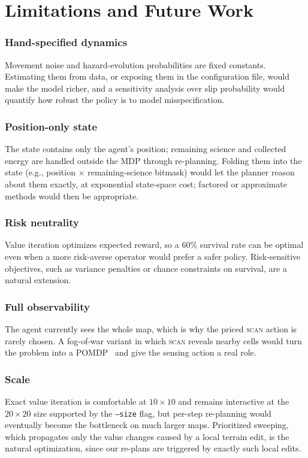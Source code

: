 \documentclass[conference]{IEEEtran}
\begin{document}
\section{Limitations and Future Work}\label{sec:limitations}

\subsubsection{Hand-specified dynamics} Movement noise and hazard-evolution probabilities are fixed constants. Estimating them from data, or exposing them in the configuration file, would make the model richer, and a sensitivity analysis over slip probability would quantify how robust the policy is to model misspecification.

\subsubsection{Position-only state} The state contains only the agent's position; remaining science and collected energy are handled outside the MDP through re-planning. Folding them into the state (e.g., position $\times$ remaining-science bitmask) would let the planner reason about them exactly, at exponential state-space cost; factored or approximate methods would then be appropriate.

\subsubsection{Risk neutrality} Value iteration optimizes expected reward, so a 60\% survival rate can be optimal even when a more risk-averse operator would prefer a safer policy. Risk-sensitive objectives, such as variance penalties or chance constraints on survival, are a natural extension.

\subsubsection{Full observability} The agent currently sees the whole map, which is why the priced \textsc{scan} action is rarely chosen. A fog-of-war variant in which \textsc{scan} reveals nearby cells would turn the problem into a POMDP~\cite{kaelbling1998} and give the sensing action a real role.

\subsubsection{Scale} Exact value iteration is comfortable at $10 \times 10$ and remains interactive at the $20 \times 20$ size supported by the \texttt{--size} flag, but per-step re-planning would eventually become the bottleneck on much larger maps. Prioritized sweeping, which propagates only the value changes caused by a local terrain edit, is the natural optimization, since our re-plans are triggered by exactly such local edits.
\end{document}
